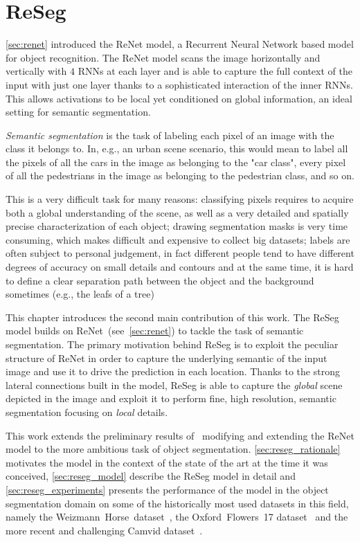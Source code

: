 \chapter{ReSeg}\label{sec:reseg}

\autoref{sec:renet} introduced the ReNet model, a Recurrent Neural Network
based model for object recognition. The ReNet model scans the image
horizontally and vertically with $4$ RNNs at each layer and is able to capture
the full context of the input with just one layer thanks to a sophisticated
interaction of the inner RNNs. This allows activations to be local yet
conditioned on global information, an ideal setting for semantic segmentation.

\emph{Semantic segmentation} is the task of labeling each pixel of an image
with the class it belongs to. In, e.g., an urban scene scenario, this would
mean to label all the pixels of all the cars in the image as belonging to the
"car class", every pixel of all the pedestrians in the image as belonging to
the pedestrian class, and so on.

This is a very difficult task for many reasons: classifying pixels requires to
acquire both a global understanding of the scene, as well as a very detailed
and spatially precise characterization of each object; drawing segmentation
masks is very time consuming, which makes difficult and expensive to collect
big datasets; labels are often subject to personal judgement, in fact different
people tend to have different degrees of accuracy on small details and
contours and at the same time, it is hard to define a clear separation path
between the object and the background sometimes (e.g., the leafs of a tree)


This chapter introduces the second main contribution of this work. The ReSeg
model builds on ReNet~(see~\autoref{sec:renet}) to tackle the task of semantic
segmentation. The primary motivation behind ReSeg is to exploit the peculiar
structure of ReNet in order to capture the underlying semantic of the input
image and use it to drive the prediction in each location. Thanks to the strong
lateral connections built in the model, ReSeg is able to capture the
\emph{global} scene depicted in the image and exploit it to perform fine,
high resolution, semantic segmentation focusing on \emph{local} details.

This work extends the preliminary results of~\cite{visin2015renet} modifying
and extending the ReNet model to the more ambitious task of object
segmentation. \autoref{sec:reseg_rationale} motivates the model in the context
of the state of the art at the time it was conceived, \autoref{sec:reseg_model}
describe the ReSeg model in detail and \autoref{sec:reseg_experiments} presents
the performance of the model in the object segmentation domain on some of the
historically most used datasets in this field, namely the
Weizmann~Horse~dataset~\cite{Borenstein04combiningtop-down}, the
Oxford~Flowers~17 dataset~\cite{Nilsback06} and the more recent and challenging
Camvid dataset~\citep{Brostow2010semantic,BrostowECCV08}.

